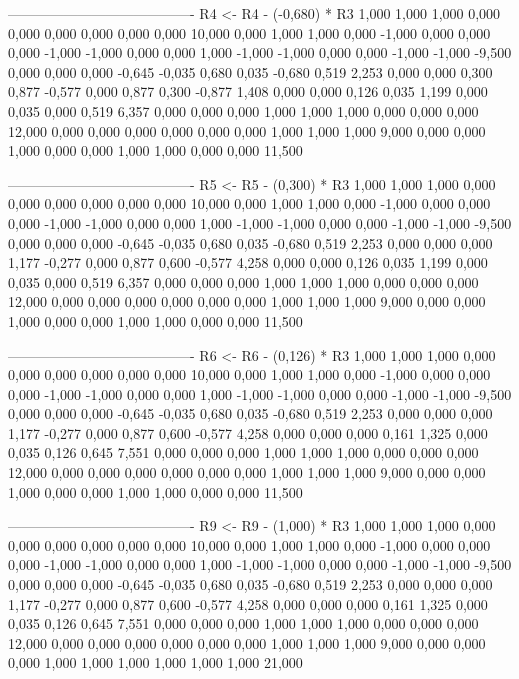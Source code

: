 \documentclass[12pt]{article}
\begin{document}
\begin{enumerate}
\begin{keluaran}
----------------------------------------
R4 <- R4 - (-0,680) * R3
1,000   1,000   1,000   0,000   0,000   0,000   0,000   0,000   0,000   10,000
0,000   1,000   1,000   0,000   -1,000  0,000   0,000   0,000   -1,000  -1,000
0,000   0,000   1,000   -1,000  -1,000  0,000   0,000   -1,000  -1,000  -9,500
0,000   0,000   0,000   -0,645  -0,035  0,680   0,035   -0,680  0,519   2,253
0,000   0,000   0,300   0,877   -0,577  0,000   0,877   0,300   -0,877  1,408
0,000   0,000   0,126   0,035   1,199   0,000   0,035   0,000   0,519   6,357
0,000   0,000   0,000   1,000   1,000   1,000   0,000   0,000   0,000   12,000
0,000   0,000   0,000   0,000   0,000   0,000   1,000   1,000   1,000   9,000
0,000   0,000   1,000   0,000   0,000   1,000   1,000   0,000   0,000   11,500

----------------------------------------
R5 <- R5 - (0,300) * R3
1,000   1,000   1,000   0,000   0,000   0,000   0,000   0,000   0,000   10,000
0,000   1,000   1,000   0,000   -1,000  0,000   0,000   0,000   -1,000  -1,000
0,000   0,000   1,000   -1,000  -1,000  0,000   0,000   -1,000  -1,000  -9,500
0,000   0,000   0,000   -0,645  -0,035  0,680   0,035   -0,680  0,519   2,253
0,000   0,000   0,000   1,177   -0,277  0,000   0,877   0,600   -0,577  4,258
0,000   0,000   0,126   0,035   1,199   0,000   0,035   0,000   0,519   6,357
0,000   0,000   0,000   1,000   1,000   1,000   0,000   0,000   0,000   12,000
0,000   0,000   0,000   0,000   0,000   0,000   1,000   1,000   1,000   9,000
0,000   0,000   1,000   0,000   0,000   1,000   1,000   0,000   0,000   11,500

----------------------------------------
R6 <- R6 - (0,126) * R3
1,000   1,000   1,000   0,000   0,000   0,000   0,000   0,000   0,000   10,000
0,000   1,000   1,000   0,000   -1,000  0,000   0,000   0,000   -1,000  -1,000
0,000   0,000   1,000   -1,000  -1,000  0,000   0,000   -1,000  -1,000  -9,500
0,000   0,000   0,000   -0,645  -0,035  0,680   0,035   -0,680  0,519   2,253
0,000   0,000   0,000   1,177   -0,277  0,000   0,877   0,600   -0,577  4,258
0,000   0,000   0,000   0,161   1,325   0,000   0,035   0,126   0,645   7,551
0,000   0,000   0,000   1,000   1,000   1,000   0,000   0,000   0,000   12,000
0,000   0,000   0,000   0,000   0,000   0,000   1,000   1,000   1,000   9,000
0,000   0,000   1,000   0,000   0,000   1,000   1,000   0,000   0,000   11,500

----------------------------------------
R9 <- R9 - (1,000) * R3
1,000   1,000   1,000   0,000   0,000   0,000   0,000   0,000   0,000   10,000
0,000   1,000   1,000   0,000   -1,000  0,000   0,000   0,000   -1,000  -1,000
0,000   0,000   1,000   -1,000  -1,000  0,000   0,000   -1,000  -1,000  -9,500
0,000   0,000   0,000   -0,645  -0,035  0,680   0,035   -0,680  0,519   2,253
0,000   0,000   0,000   1,177   -0,277  0,000   0,877   0,600   -0,577  4,258
0,000   0,000   0,000   0,161   1,325   0,000   0,035   0,126   0,645   7,551
0,000   0,000   0,000   1,000   1,000   1,000   0,000   0,000   0,000   12,000
0,000   0,000   0,000   0,000   0,000   0,000   1,000   1,000   1,000   9,000
0,000   0,000   0,000   1,000   1,000   1,000   1,000   1,000   1,000   21,000


\end{keluaran}
\end{enumerate}
\end{document}
